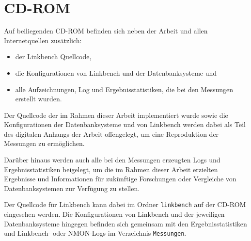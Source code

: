 \chapter{CD-ROM}

Auf beiliegenden CD-ROM befinden sich neben der Arbeit und allen Internetquellen zusätzlich:
\begin{itemize}
    \item der Linkbench Quellcode,
    \item die Konfigurationen von Linkbench und der Datenbanksysteme und
    \item alle Aufzeichnungen, Log und Ergebnisstatistiken, die bei den Messungen erstellt wurden. 
\end{itemize}

Der Quellcode der im Rahmen dieser Arbeit implementiert wurde sowie die Konfigurationen der Datenbanksysteme und von Linkbench werden dabei als Teil des digitalen Anhangs der Arbeit offengelegt, um eine Reproduktion der Messungen zu ermöglichen. 

Darüber hinaus werden auch alle bei den Messungen erzeugten Logs und Ergebnisstatistiken beigelegt, um die im Rahmen dieser Arbeit erzielten Ergebnisse und Informationen für zukünftige Forschungen oder Vergleiche von Datenbanksystemen zur Verfügung zu stellen. 

Der Quellcode für Linkbench kann dabei im Ordner \texttt{linkbench} auf der CD-ROM eingesehen werden. Die Konfigurationen von Linkbench und der jeweiligen Datenbanksysteme hingegen befinden sich gemeinsam mit den Ergebnisstatistiken und Linkbench- oder NMON-Logs im Verzeichnis \texttt{Messungen}.